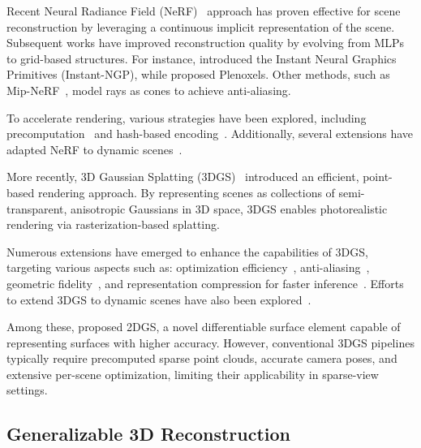 Recent Neural Radiance Field (NeRF)~\cite{mildenhall2021nerf} approach has proven effective for scene reconstruction by leveraging a continuous implicit representation of the scene. Subsequent works have improved reconstruction quality by evolving from MLPs to grid-based structures. For instance, \cite{muller2022instant} introduced the Instant Neural Graphics Primitives (Instant-NGP), while \cite{fridovich2022plenoxels} proposed Plenoxels. Other methods, such as Mip-NeRF~\cite{barron2021mip,barron2022mip}, model rays as cones to achieve anti-aliasing.

To accelerate rendering, various strategies have been explored, including precomputation~\cite{wang2023f2,wang2022fourier,fridovich2022plenoxels,yu2021plenoctrees} and hash-based encoding~\cite{muller2022instant,takikawa2022variable}. Additionally, several extensions have adapted NeRF to dynamic scenes~\cite{xian2021space,park2021nerfies,park2021hypernerf,pumarola2021d,song2023nerfplayer}.

More recently, 3D Gaussian Splatting (3DGS)~\cite{kerbl20233d} introduced an efficient, point-based rendering approach. By representing scenes as collections of semi-transparent, anisotropic Gaussians in 3D space, 3DGS enables photorealistic rendering via rasterization-based splatting.

Numerous extensions have emerged to enhance the capabilities of 3DGS, targeting various aspects such as: optimization efficiency~\cite{cheng2024gaussianpro,zhang2024fregs,radl2024stopthepop,diolatzis2024n}, anti-aliasing~\cite{yan2024multi,yu2024mip,song2024sa,liang2024analytic}, geometric fidelity~\cite{huang20242d}, and representation compression for faster inference~\cite{girish2024eagles,navaneet2024compgs,niedermayr2024compressed,lee2024compact,fan2024lightgaussian,chen2024hac}. Efforts to extend 3DGS to dynamic scenes have also been explored~\cite{luiten2023dynamic,wu20234d,wan2024superpoint,huang2023sc,he2024s4d}.

Among these, \cite{huang20242d} proposed 2DGS, a novel differentiable surface element capable of representing surfaces with higher accuracy. However, conventional 3DGS pipelines typically require precomputed sparse point clouds, accurate camera poses, and extensive per-scene optimization, limiting their applicability in sparse-view settings.

\subsection{Generalizable 3D Reconstruction}

